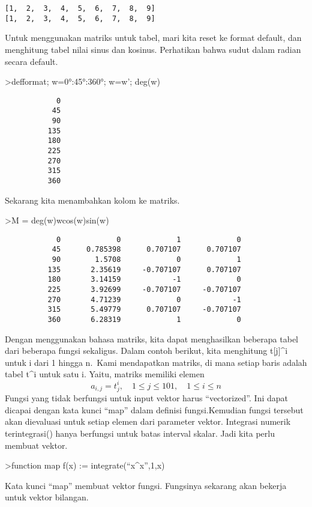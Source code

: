 \documentclass[
]{book}
\begin{document}
\begin{verbatim}
[1,  2,  3,  4,  5,  6,  7,  8,  9]
[1,  2,  3,  4,  5,  6,  7,  8,  9]
\end{verbatim}

Untuk menggunakan matriks untuk tabel, mari kita reset ke format default, dan menghitung tabel nilai sinus dan kosinus. Perhatikan bahwa sudut dalam radian secara default.

\textgreater defformat; w=0°:45°:360°; w=w'; deg(w)

\begin{verbatim}
            0 
           45 
           90 
          135 
          180 
          225 
          270 
          315 
          360 
\end{verbatim}

Sekarang kita menambahkan kolom ke matriks.

\textgreater M = deg(w)\textbar w\textbar cos(w)\textbar sin(w)

\begin{verbatim}
            0             0             1             0 
           45      0.785398      0.707107      0.707107 
           90        1.5708             0             1 
          135       2.35619     -0.707107      0.707107 
          180       3.14159            -1             0 
          225       3.92699     -0.707107     -0.707107 
          270       4.71239             0            -1 
          315       5.49779      0.707107     -0.707107 
          360       6.28319             1             0 
\end{verbatim}

Dengan menggunakan bahasa matriks, kita dapat menghasilkan beberapa tabel dari beberapa fungsi sekaligus. Dalam contoh berikut, kita menghitung t{[}j{]}\^{}i untuk i dari 1 hingga n.~Kami mendapatkan matriks, di mana setiap baris adalah tabel t\^{}i untuk satu i. Yaitu, matriks memiliki elemen \[a_{i,j} = t_j^i, \quad 1 \le j \le 101, \quad 1 \le i \le n\]Fungsi yang tidak berfungsi untuk input vektor harus ``vectorized''. Ini dapat dicapai dengan kata kunci ``map'' dalam definisi fungsi.Kemudian fungsi tersebut akan dievaluasi untuk setiap elemen dari parameter vektor. Integrasi numerik terintegrasi() hanya berfungsi untuk batas interval skalar. Jadi kita perlu membuat vektor.

\textgreater function map f(x) := integrate(``x\^{}x'',1,x)

Kata kunci ``map'' membuat vektor fungsi. Fungsinya sekarang akan bekerja untuk vektor bilangan.
\end{document}
